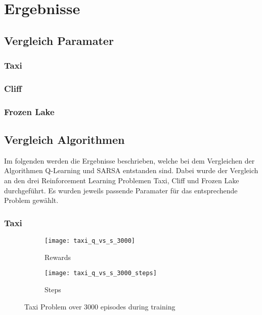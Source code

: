 \section{Ergebnisse}

\subsection{Vergleich Paramater}
\subsubsection{Taxi}

\subsubsection{Cliff}

\subsubsection{Frozen Lake}

\subsection{Vergleich Algorithmen}

Im folgenden werden die Ergebnisse beschrieben, welche bei dem Vergleichen der Algorithmen Q-Learning und SARSA entstanden sind.
Dabei wurde der Vergleich an den drei Reinforcement Learning Problemen Taxi, Cliff und Frozen Lake durchgeführt. Es wurden jeweils passende Paramater für das entsprechende Problem gewählt.
\subsubsection{Taxi}

\begin{figure}
    \centering
    \begin{subfigure}{.5\textwidth}
      \centering
      \texttt{[image: taxi\_q\_vs\_s\_3000]}
      \caption{Rewards}
      \label{fig:taxi_rew}
    \end{subfigure}%
    \begin{subfigure}{.5\textwidth}
      \centering
      \texttt{[image: taxi\_q\_vs\_s\_3000\_steps]}
      \caption{Steps}
      \label{fig:taxi_step}
    \end{subfigure}
    \caption{Taxi Problem over 3000 episodes during training}
    \label{fig:taxi_train}
\end{figure}

